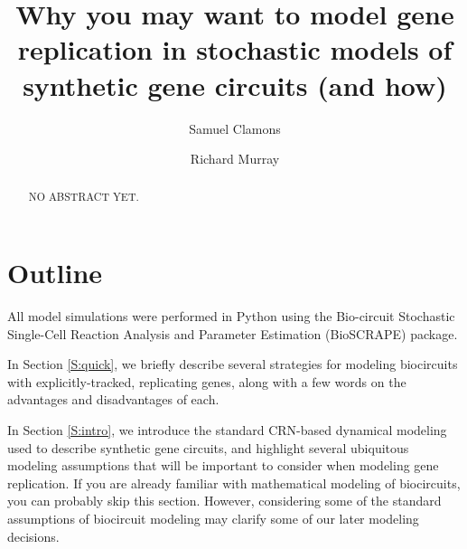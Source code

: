 \documentclass[preprint,12pt]{elsarticle}
\begin{document}
\begin{frontmatter}


\title{Why you may want to model gene replication in stochastic models of synthetic gene circuits (and how)}




\author{Samuel Clamons}
\author{Richard Murray}

\address{Caltech, Pasadena, CA, United States}


\begin{abstract}
NO ABSTRACT YET.
\end{abstract}

\end{frontmatter}

\section{Outline}
\label{S:outline}

All model simulations were performed in Python using the Bio-circuit Stochastic Single-Cell Reaction Analysis and Parameter Estimation (BioSCRAPE) package. 

In Section \ref{S:quick}, we briefly describe several strategies for modeling biocircuits with explicitly-tracked, replicating genes, along with a few words on the advantages and disadvantages of each. 

In Section \ref{S:intro}, we introduce the standard CRN-based dynamical modeling used to describe synthetic gene circuits, and highlight several ubiquitous modeling assumptions that will be important to consider when modeling gene replication. If you are already familiar with mathematical modeling of biocircuits, you can probably skip this section. However, considering some of the standard assumptions of biocircuit modeling may clarify some of our later modeling decisions.
\end{document}
